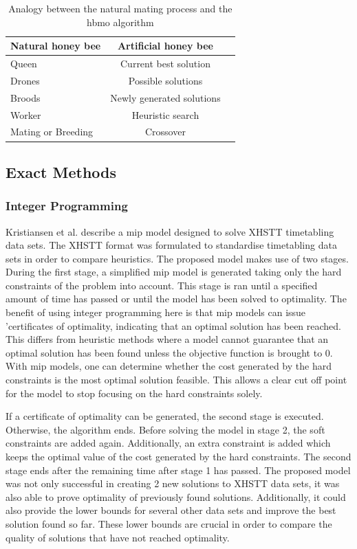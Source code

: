 \begin{table}[h]
	\caption{Analogy between the natural mating process and the \acrshort{hbmo} algorithm}
	\label{tab:hbmo}
	\centering
	\begin{tabular}{l c c }
		\hline
		\textbf{Natural honey bee}  & \textbf{Artificial honey bee} \\ \hline
		Queen & Current best solution \\
		Drones & Possible solutions \\
	    Broods & Newly generated solutions \\
            Worker & Heuristic search \\
            Mating or Breeding & Crossover \\ \hline
	\end{tabular}
\end{table}


\subsection{Exact Methods}
\subsubsection{Integer Programming}

Kristiansen et al. \cite{kristiansen2015} describe a \acrfull{mip} model designed to solve XHSTT timetabling data sets. The XHSTT format was formulated to standardise timetabling data sets in order to compare heuristics. The proposed model makes use of two stages. During the first stage, a simplified \acrshort{mip} model is generated taking only the hard constraints of the problem into account. This stage is ran until a specified amount of time has passed or until the model has been solved to optimality. The benefit of using integer programming here is that \acrshort{mip} models can issue 'certificates of optimality, indicating that an optimal solution has been reached. This differs from heuristic methods where a model cannot guarantee that an optimal solution has been found unless the objective function is brought to 0. With \acrshort{mip} models, one can determine whether the cost generated by the hard constraints is the most optimal solution feasible. This allows a clear cut off point for the model to stop focusing on the hard constraints solely. 

If a certificate of optimality can be generated, the second stage is executed. Otherwise, the algorithm ends. Before solving the model in stage 2, the soft constraints are added again. Additionally, an extra constraint is added which keeps the optimal value of the cost generated by the hard constraints. The second stage ends after the remaining time after stage 1 has passed. The proposed model was not only successful in creating 2 new solutions to XHSTT data sets, it was also able to prove optimality of previously found solutions. Additionally, it could also provide the lower bounds for several other data sets and improve the best solution found so far. These lower bounds are crucial in order to compare the quality of solutions that have not reached optimality.

